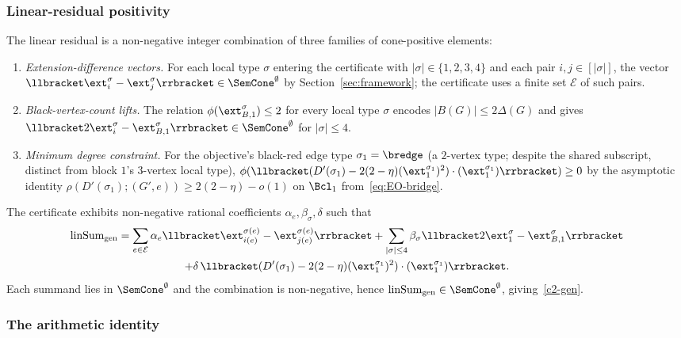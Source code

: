 \documentclass[11pt,a4paper]{article}
\theoremstyle{definition}
\theoremstyle{remark}
\begin{document}
\subsubsection{Linear-residual positivity}

The linear residual is a non-negative integer combination of three
families of cone-positive elements:

\begin{enumerate}[label=\textup{(R\arabic*)}]
\item \emph{Extension-difference vectors.} For each local type
$\sigma$ entering the certificate with $|\sigma| \in \{1, 2, 3, 4\}$ and
each pair $i, j \in [|\sigma|]$, the vector
$\llbracket\ext_i^\sigma - \ext_j^\sigma\rrbracket \in
\SemCone^\emptyset$ by Section~\ref{sec:framework}; the certificate uses a
finite set $\mathcal{E}$ of such pairs.
\item \emph{Black-vertex-count lifts.} The relation
$\phi(\ext_{B,1}^\sigma) \leq 2$ for every local type
$\sigma$ encodes $|B(G)| \leq 2\Delta(G)$ and gives
$\llbracket 2\ext_i^\sigma - \ext_{B,1}^\sigma\rrbracket \in
\SemCone^\emptyset$ for $|\sigma| \leq 4$.
\item \emph{Minimum degree constraint.} For the objective's
black-red edge type $\sigma_1 = \bredge$ (a $2$-vertex type; despite the
shared subscript, distinct from block $1$'s $3$-vertex local type),
$\phi(\llbracket(D'(\sigma_1) - 2(2-\eta)(\ext_1^{\sigma_1})^2)
\cdot (\ext_1^{\sigma_1})\rrbracket) \geq 0$
by the asymptotic identity
$\rho(D'(\sigma_1); (G', e)) \geq 2(2 - \eta) - o(1)$ on
$\Bcl_1$ from~\eqref{eq:EO-bridge}.
\end{enumerate}

The certificate exhibits non-negative rational coefficients
$\alpha_e, \beta_\sigma, \delta$ such that
\begin{multline*}
\mathrm{linSum}_{\mathrm{gen}}
= \sum_{e \in \mathcal{E}} \alpha_e
\llbracket \ext_{i(e)}^{\sigma(e)} - \ext_{j(e)}^{\sigma(e)}\rrbracket
+ \sum_{|\sigma| \leq 4} \beta_\sigma
\llbracket 2\ext_1^\sigma - \ext_{B,1}^\sigma\rrbracket\\
+ \delta\,\llbracket(D'(\sigma_1) - 2(2-\eta)(\ext_1^{\sigma_1})^2)
\cdot (\ext_1^{\sigma_1})\rrbracket.
\end{multline*}
Each summand lies in $\SemCone^\emptyset$ and the combination is
non-negative, hence
$\mathrm{linSum}_{\mathrm{gen}} \in \SemCone^\emptyset$, giving~\ref{c2-gen}.

\subsubsection{The arithmetic identity}
\end{document}
